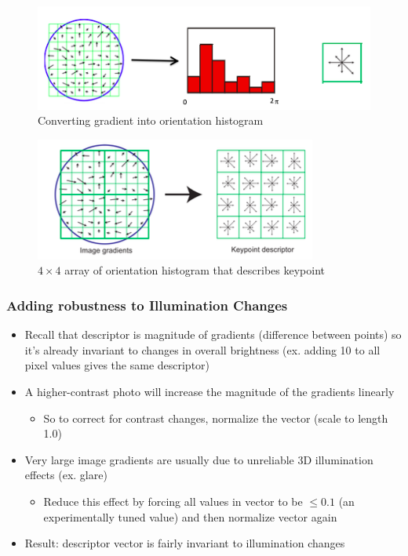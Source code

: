 \documentclass[letterpaper,12pt]{article}
\begin{document}
\begin{figure}
 \centering
 \includegraphics[scale=0.75]{images/orientation_histogram.png}
 \caption{Converting gradient into orientation histogram}
\end{figure}
\begin{figure}
 \centering
 \includegraphics[scale=0.75]{images/orientatioN_histogram_array.png}
 \caption{$4 \times 4$ array of orientation histogram that describes keypoint}
\end{figure}

\subsubsection{Adding robustness to Illumination Changes}
\begin{itemize}
 \item Recall that descriptor is magnitude of gradients (difference  between points) so it's already invariant to changes in overall brightness (ex. adding 10 to all pixel values gives the same descriptor)
 \item A higher-contrast photo will increase the magnitude of the gradients linearly
       \begin{itemize}
        \item So to correct for contrast changes, normalize the vector (scale to length 1.0)
       \end{itemize}
 \item Very large image gradients are usually due to unreliable 3D illumination effects (ex. glare)
       \begin{itemize}
        \item Reduce this effect by forcing all values in vector to be $\leq 0.1$ (an experimentally tuned value) and then normalize vector again
       \end{itemize}
 \item Result: descriptor vector is fairly invariant to illumination changes
\end{itemize}
\end{document}
